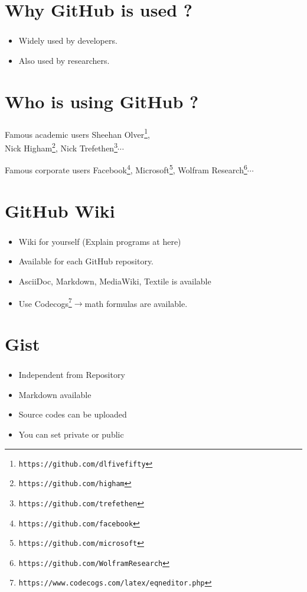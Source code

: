 \documentclass[dvipdfmx,10pt]{beamer}
\newcommand{\ft}{\frametitle}
\newcommand{\bit}{\begin{itemize}}
\newcommand{\eit}{\end{itemize}}
\begin{document}
\section{Why GitHub is used ?}
\begin{frame}\ft{\insertsection}
\begin{exampleblock}{\insertsection}
\begin{itemize}
\item Widely used by developers.
\item Also used by researchers.
\end{itemize}
\end{exampleblock}
\end{frame}
\section{Who is using GitHub ?}
\begin{frame}\ft{\insertsection}
\begin{exampleblock}{Famous academic users}
Sheehan Olver\footnote{\texttt{https://github.com/dlfivefifty}},\\ Nick Higham\footnote{\texttt{https://github.com/higham}}, Nick Trefethen\footnote{\texttt{https://github.com/trefethen}}$\cdots$
\end{exampleblock}
\begin{exampleblock}{Famous corporate users}
Facebook\footnote{\texttt{https://github.com/facebook}}, Microsoft\footnote{\texttt{https://github.com/microsoft}}, Wolfram Research\footnote{\texttt{https://github.com/WolframResearch}}$\cdots$
\end{exampleblock}
\end{frame}
\section{GitHub Wiki}
\begin{frame}\ft{\insertsection}
\bit
\item Wiki for yourself (Explain programs at here)
\item Available for each GitHub repository.
\item AsciiDoc, Markdown, MediaWiki, Textile is available
\item Use Codecogs\footnote{\texttt{https://www.codecogs.com/latex/eqneditor.php}}$\to$math formulas are available.
\eit
\end{frame}
\section{Gist}
\begin{frame}\ft{\insertsection}
\bit
\item Independent from Repository 
\item Markdown available
\item Source codes can be uploaded
\item You can set private or public
\eit
\end{frame}
\end{document}
